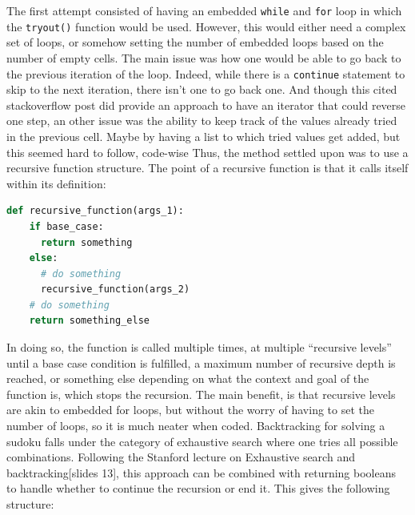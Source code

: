 \documentclass[12pt]{report} %
\begin{document}
The first attempt consisted of having an embedded \texttt{while} and \texttt{for} loop in which the \texttt{tryout()} function would be used. However, this would either need a complex set of loops, or somehow setting the number of embedded loops based on the number of empty cells. The main issue was how one would be able to go back to the previous iteration of the loop. Indeed, while there is a \texttt{continue} statement to skip to the next iteration, there isn't one to go back one\cite{stackoverflow_python_for_loop}. And though this cited stackoverflow post did provide an approach to have an iterator that could reverse one step, an other issue was the ability to keep track of the values already tried in the previous cell\cite{stackoverflow_python_for_loop}. Maybe by having a list to which tried values get added, but this seemed hard to follow, code-wise Thus, the method settled upon was to use a recursive function structure. The point of a recursive function is that it calls itself within its definition\cite{stackoverflow_recursion_python}:

\begin{lstlisting}[language=Python, caption = {Recursive function structure}]
  def recursive_function(args_1):
    if base_case:
      return something
    else:
      # do something
      recursive_function(args_2)
    # do something
    return something_else
\end{lstlisting}

In doing so, the function is called multiple times, at multiple ``recursive levels'' until a base case condition is fulfilled, a maximum number of recursive depth is reached\cite{stackoverflow_recursion_depth}, or something else depending on what the context and goal of the function is, which stops the recursion. The main benefit, is  that recursive levels are akin to embedded for loops, but without the worry of having to set the number of loops, so it is much neater when coded.
Backtracking for solving a sudoku falls under the category of exhaustive search where one tries all possible combinations. Following the Stanford lecture on Exhaustive search and backtracking[slides 13]\cite{stanford_lecture}, this approach can be combined with returning booleans to handle whether to continue the recursion or end it. This gives the following structure:
\end{document}
